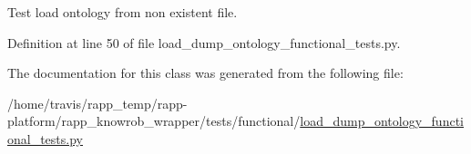 Test load ontology from non existent file. 



Definition at line 50 of file load\-\_\-dump\-\_\-ontology\-\_\-functional\-\_\-tests.\-py.



The documentation for this class was generated from the following file\-:\begin{DoxyCompactItemize}
\item 
/home/travis/rapp\-\_\-temp/rapp-\/platform/rapp\-\_\-knowrob\-\_\-wrapper/tests/functional/\hyperlink{load__dump__ontology__functional__tests_8py}{load\-\_\-dump\-\_\-ontology\-\_\-functional\-\_\-tests.\-py}\end{DoxyCompactItemize}
